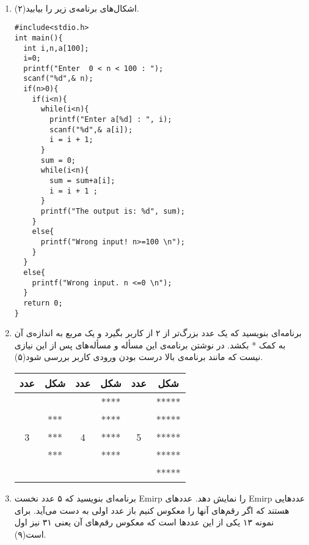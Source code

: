 \documentclass[12pt, a4paper]{article}
\author{Ahmad Yoosofan}
\date{\today}
\begin{document}
\pagestyle{empty}  %
\\
\begin{enumerate}
\item
اشکال‌های برنامه‌ی زیر را بیابید(۲). 
\\
\begin{latin}


\begin{lstlisting}  
#include<stdio.h>
int main(){
  int i,n,a[100];
  i=0;
  printf("Enter  0 < n < 100 : ");
  scanf("%d",& n);
  if(n>0){
    if(i<n){
      while(i<n){
        printf("Enter a[%d] : ", i);
        scanf("%d",& a[i]);
        i = i + 1;
      }
      sum = 0;
      while(i<n){
        sum = sum+a[i];
        i = i + 1 ;
      }
      printf("The output is: %d", sum);
    }
    else{
      printf("Wrong input! n>=100 \n");
    }
  }
  else{
    printf("Wrong input. n <=0 \n");
  }
  return 0;
}
\end{lstlisting}
\end{latin}
\item
برنامه‌ای بنویسید که یک عدد بزرگ‌تر از ۲ از کاربر بگیرد و یک مربع به اندازه‌ی آن به کمک * بکشد. در نوشتن برنامه‌ی این مسأله و مسأله‌های پس از این نیازی نیست که مانند برنامه‌ی بالا درست بودن ورودی کاربر  بررسی شود(۵). 
\begin{center} 
\begin{tabular}{| c   | c | c  | c | c| c |} \hline
   عدد  & 
شکل  & 
عدد    & 
شکل  & 
عدد      & 
شکل 
   \\ %
\hline
  &     &   &****  &   & ***** \\
  & *** &   &****  &   & ***** \\
3 & *** & 4 &****  & 5 & ***** \\
  & *** &   &****  &   & ***** \\
  &     &   &      &   & ***** \\
\hline \end{tabular} \end{center} 
\item
برنامه‌ای بنویسید که ۵ عدد نخست Emirp را نمایش دهد.
عددهای Emirp عددهایی هستند که اگر رقم‌های آنها را معکوس کنیم باز عدد اولی به دست می‌آید. برای نمونه ۱۳
یکی از این عددها است که معکوس رقم‌های آن یعنی ۳۱ نیز اول است(۹).


\end{enumerate}
\end{document}
